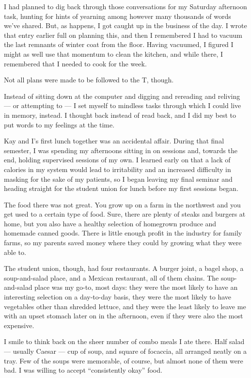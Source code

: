 I had planned to dig back through those conversations for my Saturday afternoon task, hunting for hints of yearning among however many thousands of words we've shared. But, as happens, I got caught up in the business of the day. I wrote that entry earlier full on planning this, and then I remembered I had to vacuum the last remnants of winter coat from the floor. Having vacuumed, I figured I might as well use that momentum to clean the kitchen, and while there, I remembered that I needed to cook for the week.

Not all plans were made to be followed to the T, though.

Instead of sitting down at the computer and digging and rereading and reliving --- or attempting to --- I set myself to mindless tasks through which I could live in memory, instead. I thought back instead of read back, and I did my best to put words to my feelings at the time.

Kay and I's first lunch together was an accidental affair. During that final semester, I was spending my afternoons sitting in on sessions and, towards the end, holding supervised sessions of my own. I learned early on that a lack of calories in my system would lead to irritability and an increased difficulty in masking for the sake of my patients, so I began leaving my final seminar and heading straight for the student union for lunch before my first sessions began.

The food there was not great. You grow up on a farm in the northwest and you get used to a certain type of food. Sure, there are plenty of steaks and burgers at home, but you also have a healthy selection of homegrown produce and homemade canned goods. There is little enough profit in the industry for family farms, so my parents saved money where they could by growing what they were able to.

The student union, though, had four restaurants. A burger joint, a bagel shop, a soup-and-salad place, and a Mexican restaurant, all of them chains. The soup-and-salad place was my go-to, most days: they were the most likely to have an interesting selection on a day-to-day basis, they were the most likely to have vegetables other than shredded lettuce, and they were the least likely to leave me with an upset stomach later on in the afternoon, even if they were also the most expensive.

I smile to think back on the sheer number of combo meals I ate there. Half salad --- usually Caesar --- cup of soup, and square of focaccia, all arranged neatly on a tray. Few of the soups were memorable, of course, but almost none of them were bad. I was willing to accept ``consistently okay'' food.

